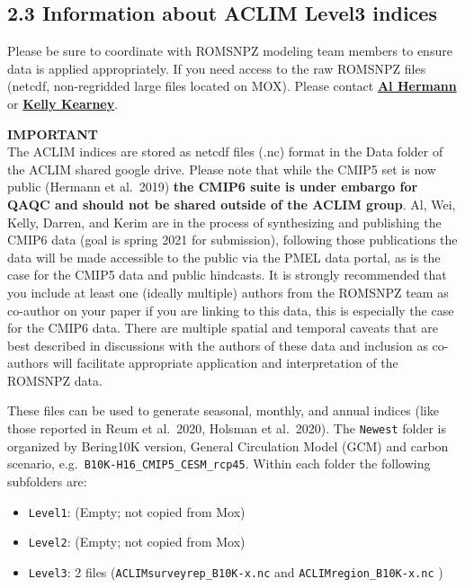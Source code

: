 \documentclass[
]{article}
\providecommand{\tightlist}{%
  \setlength{\itemsep}{0pt}\setlength{\parskip}{0pt}}
\begin{document}
\hypertarget{information-about-aclim-level3-indices}{%
\subsection{2.3 Information about ACLIM Level3
indices}\label{information-about-aclim-level3-indices}}

Please be sure to coordinate with ROMSNPZ modeling team members to
ensure data is applied appropriately. If you need access to the raw
ROMSNPZ files (netcdf, non-regridded large files located on MOX). Please
contact \href{albert.j.hermann@noaa.gov}{\textbf{Al Hermann}} or
\href{kelly.kearney@noaa.gov}{\textbf{Kelly Kearney}}.

\textbf{IMPORTANT}\\
The ACLIM indices are stored as netcdf files (.nc) format in the Data
folder of the ACLIM shared google drive. Please note that while the
CMIP5 set is now public (Hermann et al.~2019) \textbf{the CMIP6 suite is
under embargo for QAQC and should not be shared outside of the ACLIM
group}. Al, Wei, Kelly, Darren, and Kerim are in the process of
synthesizing and publishing the CMIP6 data (goal is spring 2021 for
submission), following those publications the data will be made
accessible to the public via the PMEL data portal, as is the case for
the CMIP5 data and public hindcasts. It is strongly recommended that you
include at least one (ideally multiple) authors from the ROMSNPZ team as
co-author on your paper if you are linking to this data, this is
especially the case for the CMIP6 data. There are multiple spatial and
temporal caveats that are best described in discussions with the authors
of these data and inclusion as co-authors will facilitate appropriate
application and interpretation of the ROMSNPZ data.

These files can be used to generate seasonal, monthly, and annual
indices (like those reported in Reum et al.~2020, Holsman et al.~2020).
The \texttt{Newest} folder is organized by Bering10K version, General
Circulation Model (GCM) and carbon scenario,
e.g.~\texttt{B10K-H16\_CMIP5\_CESM\_rcp45}. Within each folder the
following subfolders are:

\begin{itemize}
\tightlist
\item
  \texttt{Level1}: (Empty; not copied from Mox)
\item
  \texttt{Level2}: (Empty; not copied from Mox)
\item
  \texttt{Level3}: 2 files (\texttt{ACLIMsurveyrep\_B10K-x.nc} and
  \texttt{ACLIMregion\_B10K-x.nc} )
\end{itemize}
\end{document}
